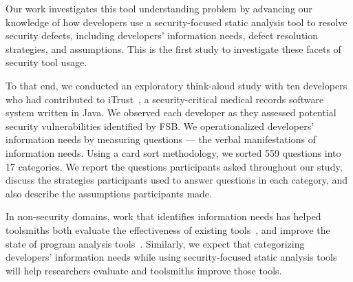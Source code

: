 \documentclass[10pt,journal,compsoc]{IEEEtran}
\begin{document}
Our work investigates this tool understanding problem by advancing our knowledge of how developers use a security-focused static analysis tool to resolve security defects, including developers' information needs, defect resolution strategies, and assumptions.
This is the first study to investigate these facets of security tool usage. 

To that end, we conducted an exploratory think-aloud study with ten developers who had contributed to iTrust~\cite{iTrust}, a security-critical medical records software system written in Java.
We observed each developer as they assessed potential security vulnerabilities identified by FSB. 
We operationalized developers' information needs by measuring questions --- the verbal manifestations of information needs.
Using a card sort methodology, we sorted 559 questions into 17 categories. 
We report the questions participants asked throughout our study, discuss the strategies participants used to answer questions in each category, and also describe the assumptions participants made.



In non-security domains, work that identifies information needs has helped toolsmiths both evaluate the effectiveness of existing tools~\cite{ammar2012empirical}, and improve the state of program analysis tools~\cite{kononenko2012automatically, servant2012history, yoon2013visualization}. 
Similarly, we expect that categorizing developers' information needs while using security-focused static analysis tools will help researchers evaluate and toolsmiths improve those tools. 






\end{document}
